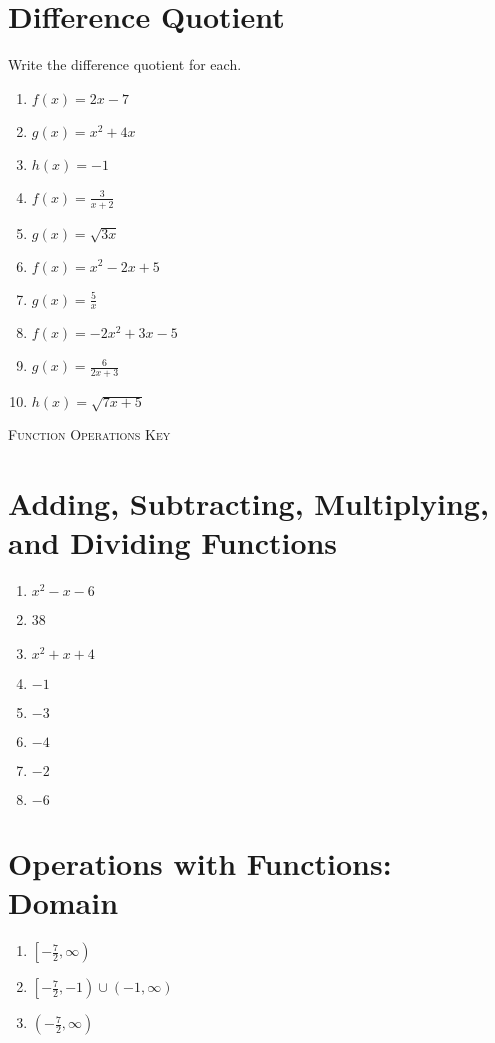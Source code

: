 \section{Difference Quotient}

Write the difference quotient for each.
\begin{enumerate}
	\item $f(x) = 2x - 7$
	\item $g(x) = x^2 + 4x$
	\item $h(x) = -1$
	\item $f(x) = \frac{3}{x+2}$
	\item $g(x) = \sqrt{3x}$
	\item $f(x) = x^2 - 2x + 5$
	\item $g(x) = \frac{5}{x}$
	\item $f(x) = -2x^2 + 3x - 5$
	\item $g(x) = \frac{6}{2x+3}$
	\item $h(x) = \sqrt{7x+5}$
\end{enumerate}


\newpage


\textsc{Function Operations Key}

\section*{Adding, Subtracting, Multiplying, and Dividing Functions}

\begin{enumerate}
    \item $x^2-x-6$
    \item 38
    \item $x^2+x+4$
    \item $-1$
     \item $-3$
     \item $-4$
     \item $-2$
     \item $-6$
\end{enumerate}

\section*{Operations with Functions: Domain}
\begin{enumerate}
	\item $\left[-\frac{7}{2}, \infty\right)$
    \item $\left[-\frac{7}{2}, -1\right) \cup (-1, \infty)$
    \item $\left(-\frac{7}{2}, \infty\right)$
\end{enumerate}

